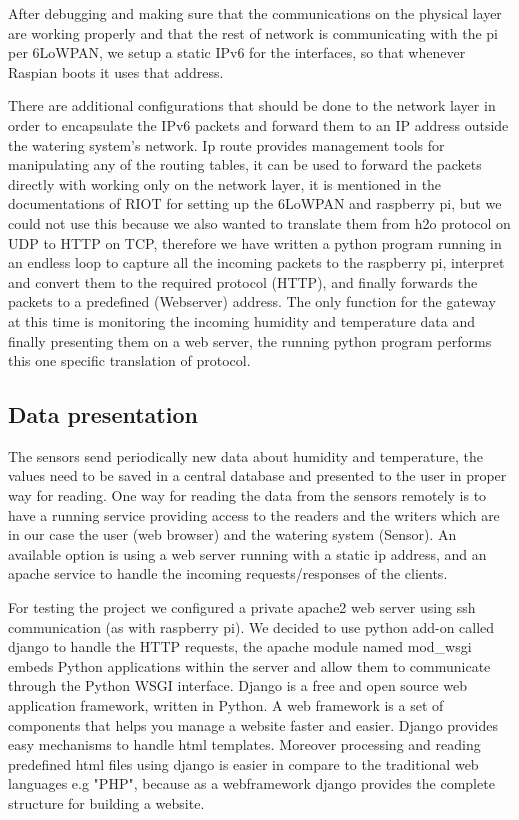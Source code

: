 \documentclass[11pt,paper=a4,parskip=half]{scrartcl}
\begin{document}
 After debugging and making sure that the communications on the physical layer
 are working properly and that the rest of network is communicating with the pi
 per 6LoWPAN, we setup a static IPv6 for the interfaces, so that whenever Raspian boots
 it uses that address.

 There are additional configurations that should be done to the network layer in
 order to encapsulate the IPv6 packets and forward them to an IP address
 outside the watering system's network. Ip route provides management tools for
 manipulating any of the routing tables, it can be used to forward the packets
 directly with working only on the network layer, it is mentioned in the
 documentations of RIOT for setting up the 6LoWPAN and raspberry pi, but we could
 not use this because we also wanted to translate them from h2o protocol
 on UDP to HTTP on TCP, therefore we have written a python
 program running in an endless loop to capture all the incoming packets to the
 raspberry pi, interpret and convert them to the required protocol (HTTP), and
 finally forwards the packets to a predefined (Webserver) address. The only
 function for the gateway at this time is monitoring the incoming humidity and
 temperature data and finally presenting them on a web server, the running
 python program performs this one specific translation of protocol.

\subsection{Data presentation}

The sensors send periodically new data about humidity and temperature, the
values need to be saved in a central database and presented to the user in
proper way for reading.
One way for reading the data from the sensors remotely is to have a running
service providing access to the readers and the writers which are in our case
the user (web browser) and the watering system (Sensor). An available option is
using a web server running with a static ip address, and an apache service to
handle the incoming requests/responses of the clients.

For testing the project
we configured a private apache2 web server using ssh communication (as with
raspberry pi). We decided to use python add-on called django to handle the HTTP
requests, the apache module named mod\_wsgi embeds Python applications within
the server and allow them to communicate through the Python WSGI interface.
Django is a free and open source web application framework, written in Python.
A web framework is a set of components that helps you manage a website faster
and easier. Django provides easy mechanisms to handle html templates. Moreover
processing and reading predefined html files using django is easier in compare
to the traditional web languages e.g "PHP", because as a webframework django
provides the complete structure for building a website.
\end{document}
